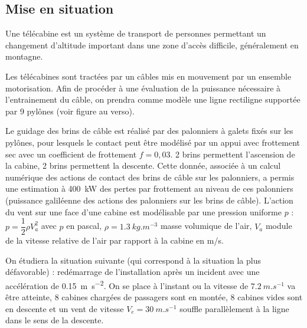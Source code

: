 \ifprof
\else
\begin{multicols}{2}
\fi
\subsection*{Mise en situation}
\ifprof\else

Une télécabine est un système de transport de personnes permettant un changement d’altitude
important dans une zone d’accès difficile, généralement en montagne.

Les télécabines sont tractées par un câbles mis en mouvement par un ensemble motorisation. 
Afin de procéder à une évaluation de la puissance nécessaire à l’entrainement du câble, on
prendra comme modèle une ligne rectiligne supportée par 9 pylônes (voir figure au verso).


Le guidage des brins de câble est réalisé par des palonniers à galets fixés sur les pylônes,  pour lesquels le contact peut être modélisé par un appui avec frottement sec avec un coefficient de frottement $f = 0,03$. 2 brins permettent l'ascension de la cabine, 2 brins permettent la descente.
Cette donnée, associée à un calcul numérique des actions de contact des brins de câble sur les
palonniers, a permis une estimation à \SI{400}{kW} des pertes par frottement au niveau de ces
palonniers (puissance galiléenne des actions des palonniers sur les brins de câble).
L’action du vent sur une face d’une cabine est modélisable par une pression uniforme $p$ : $p=\dfrac{1}{2} \rho V_a^2$
avec $p$ en pascal, $\rho=\SI{1,3}{kg.m^{-3}}$ masse volumique de l’air, $V_a$ module de la vitesse relative de l’air par rapport à la cabine en m/s.



\fi
\begin{obj}
On étudiera la situation suivante (qui correspond à la situation la plus défavorable) : redémarrage de l’installation après un incident avec une accélération de \SI{0,15}{m.s^{-2}}. On se place à l’instant ou la vitesse de $\SI{7,2}{m.s^{-1}}$ va être atteinte, 8 cabines chargées de passagers sont en montée, 8 cabines vides sont en descente et un vent de vitesse $V_e = \SI{30}{m.s^{-1}}$ souffle parallèlement à la ligne dans le sens de la descente.
\end{obj}





\end{multicols}
